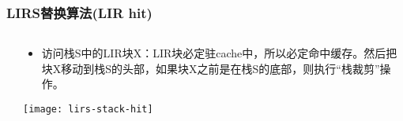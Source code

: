 \begin{frame}[plain]
	\frametitle{LIRS替换算法(LIR hit)}
	\begin{columns}
		\begin{column}{.1\textwidth}
			\centering
			
		\end{column}
		
		\begin{column}{.9\textwidth}
			
			\begin{itemize}
				\item 访问栈S中的LIR块X：LIR块必定驻cache中，所以必定命中缓存。然后把块X移动到栈S的头部，如果块X之前是在栈S的底部，则执行“栈裁剪”操作。
				
%				
			
				
				
			\end{itemize}
			\centering
             \texttt{[image: lirs-stack-hit]}
			
		\end{column}
		
		
	\end{columns}
\end{frame}



